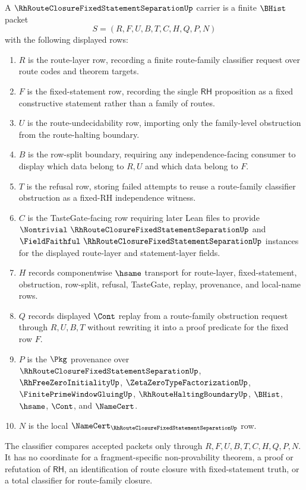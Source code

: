 \begin{definition}
\label{def:rh-route-closure-fixed-statement-separation-carrier}
A $\RhRouteClosureFixedStatementSeparationUp$ carrier is a finite $\BHist$ packet
$$
S=(R,F,U,B,T,C,H,Q,P,N)
$$
with the following displayed rows:
\begin{enumerate}
\item $R$ is the route-layer row, recording a finite route-family classifier request over route codes and theorem targets.
\item $F$ is the fixed-statement row, recording the single $\mathsf{RH}$ proposition as a fixed constructive statement rather than a family of routes.
\item $U$ is the route-undecidability row, importing only the family-level obstruction from the route-halting boundary.
\item $B$ is the row-split boundary, requiring any independence-facing consumer to display which data belong to $R,U$ and which data belong to $F$.
\item $T$ is the refusal row, storing failed attempts to reuse a route-family classifier obstruction as a fixed-RH independence witness.
\item $C$ is the TasteGate-facing row requiring later Lean files to provide $\Nontrivial\ \RhRouteClosureFixedStatementSeparationUp$ and $\FieldFaithful\ \RhRouteClosureFixedStatementSeparationUp$ instances for the displayed route-layer and statement-layer fields.
\item $H$ records componentwise $\hsame$ transport for route-layer, fixed-statement, obstruction, row-split, refusal, TasteGate, replay, provenance, and local-name rows.
\item $Q$ records displayed $\Cont$ replay from a route-family obstruction request through $R,U,B,T$ without rewriting it into a proof predicate for the fixed row $F$.
\item $P$ is the $\Pkg$ provenance over $\RhRouteClosureFixedStatementSeparationUp$, $\RhFreeZeroInitialityUp$, $\ZetaZeroTypeFactorizationUp$, $\FinitePrimeWindowGluingUp$, $\RhRouteHaltingBoundaryUp$, $\BHist$, $\hsame$, $\Cont$, and $\NameCert$.
\item $N$ is the local $\NameCert_{\RhRouteClosureFixedStatementSeparationUp}$ row.
\end{enumerate}
The classifier compares accepted packets only through $R,F,U,B,T,C,H,Q,P,N$. It has no coordinate for a fragment-specific non-provability theorem, a proof or refutation of $\mathsf{RH}$, an identification of route closure with fixed-statement truth, or a total classifier for route-family closure.
\end{definition}

